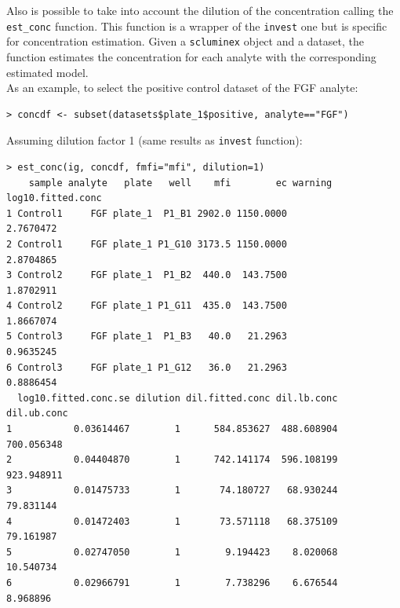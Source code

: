 \documentclass[11pt]{article}\usepackage[]{graphicx}\usepackage[]{color}
\makeatletter
\newenvironment{kframe}{%
 \def\at@end@of@kframe{}%
 \ifinner\ifhmode%
  \def\at@end@of@kframe{\end{minipage}}%
  \begin{minipage}{\columnwidth}%
 \fi\fi%
 \def\FrameCommand##1{\hskip\@totalleftmargin \hskip-\fboxsep
 \colorbox{shadecolor}{##1}\hskip-\fboxsep
     \hskip-\linewidth \hskip-\@totalleftmargin \hskip\columnwidth}%
 \MakeFramed {\advance\hsize-\width
   \@totalleftmargin\z@ \linewidth\hsize
   \@setminipage}}%
 {\par\unskip\endMakeFramed%
 \at@end@of@kframe}
\newenvironment{knitrout}{}{} %
\makeatother
\begin{document}
\noindent Also is possible to take into account the dilution of 
the concentration calling the {\tt est\_conc} function. 
This function is a wrapper of the {\tt invest} one but is specific for 
concentration estimation. Given a {\tt scluminex} object and a dataset, 
the function estimates the concentration for each analyte with the 
corresponding estimated model. \\


\noindent As an example, to select the positive control dataset of the FGF analyte:
\begin{knitrout}
\color{fgcolor}\begin{kframe}
\begin{verbatim}
> concdf <- subset(datasets$plate_1$positive, analyte=="FGF")
\end{verbatim}
\end{kframe}
\end{knitrout}

\noindent Assuming dilution factor 1 (same results as {\tt invest} function):
\begin{knitrout}
\color{fgcolor}\begin{kframe}
\begin{verbatim}
> est_conc(ig, concdf, fmfi="mfi", dilution=1)
    sample analyte   plate   well    mfi        ec warning log10.fitted.conc
1 Control1     FGF plate_1  P1_B1 2902.0 1150.0000                 2.7670472
2 Control1     FGF plate_1 P1_G10 3173.5 1150.0000                 2.8704865
3 Control2     FGF plate_1  P1_B2  440.0  143.7500                 1.8702911
4 Control2     FGF plate_1 P1_G11  435.0  143.7500                 1.8667074
5 Control3     FGF plate_1  P1_B3   40.0   21.2963                 0.9635245
6 Control3     FGF plate_1 P1_G12   36.0   21.2963                 0.8886454
  log10.fitted.conc.se dilution dil.fitted.conc dil.lb.conc dil.ub.conc
1           0.03614467        1      584.853627  488.608904  700.056348
2           0.04404870        1      742.141174  596.108199  923.948911
3           0.01475733        1       74.180727   68.930244   79.831144
4           0.01472403        1       73.571118   68.375109   79.161987
5           0.02747050        1        9.194423    8.020068   10.540734
6           0.02966791        1        7.738296    6.676544    8.968896
\end{verbatim}
\end{kframe}
\end{knitrout}
\end{document}
